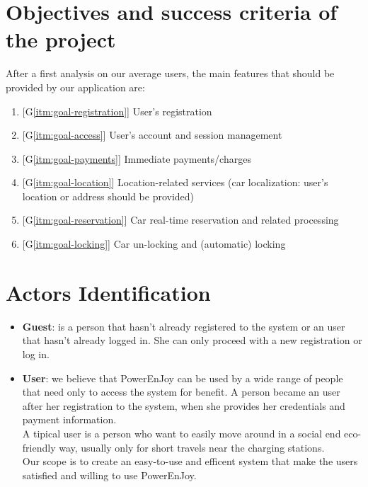 \section{Objectives and success criteria of the project}
\label{sec: proj_objectives}
After a first analysis on our average users, the main features that should be provided by our application are:
\begin{enumerate}
	\item{[G\ref{itm:goal-registration}] User's registration}\label{itm:goal-registration} %
	\item{[G\ref{itm:goal-access}] User's account and session management}\label{itm:goal-access}
	\item{[G\ref{itm:goal-payments}] Immediate payments/charges}\label{itm:goal-payments} %
	\item{[G\ref{itm:goal-location}] Location-related services (car localization: user's location or address should be provided)}\label{itm:goal-location}
	\item{[G\ref{itm:goal-reservation}] Car real-time reservation and related processing}\label{itm:goal-reservation}
	\item{[G\ref{itm:goal-locking}] Car un-locking and (automatic) locking}\label{itm:goal-locking} %
\end{enumerate}

\section{Actors Identification}
\begin{itemize}
	\item{{\bf Guest}: is a person that hasn't already registered to the system or an user that hasn't already logged in. She can only proceed with a new registration or log in.}
	\item{{\bf User}: we believe that PowerEnJoy can be used by a wide range of people that need only to access the system for benefit. A person became an user after her registration to the system, when she provides her credentials and payment information. 
	\\A tipical user is a person who want to easily move around in a social end eco-friendly way, usually only for short travels near the \glspl{charging station}.
	\\Our scope is to create an easy-to-use and efficent system that make the users satisfied and willing to use PowerEnJoy.}
\end{itemize}


